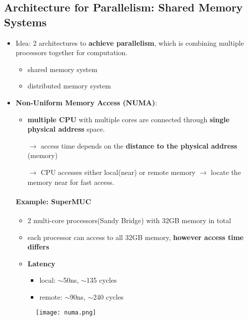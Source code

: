 \subsection{Architecture for Parallelism: Shared Memory Systems}
\begin{itemize}
	\item Idea: 2 architectures to \textbf{achieve parallelism}, which is combining multiple processors together for computation. 
	\begin{itemize}
		\item shared memory system
		\item distributed memory system
	\end{itemize}
	\item \textbf{Non-Uniform Memory Access (NUMA)}:
	\begin{itemize}
		\item \textbf{multiple CPU} with multiple cores are connected through \textbf{single physical address} space.
		
		$\rightarrow$ access time depends on the \textbf{distance to the physical address} (memory)
		
		$\rightarrow$ CPU accesses either local(near) or remote memory $\rightarrow$ locate the memory near for fast access.
	\end{itemize}
	\paragraph{Example: SuperMUC}
	
	\begin{itemize}
		\item 2 multi-core processors(Sandy Bridge) with 32GB memory in total
		\item each processor can access to all 32GB memory, \textbf{however access time differs}
		\item \textbf{Latency}
		\begin{itemize}
			\item local: $\sim$50ns, $\sim$135 cycles
			\item remote: $\sim$90ns, $\sim$240 cycles
		\end{itemize}
		
	\end{itemize}
	\begin{figure}[H]
		\centering
		\texttt{[image: numa.png]}
	\end{figure}


\end{itemize}
